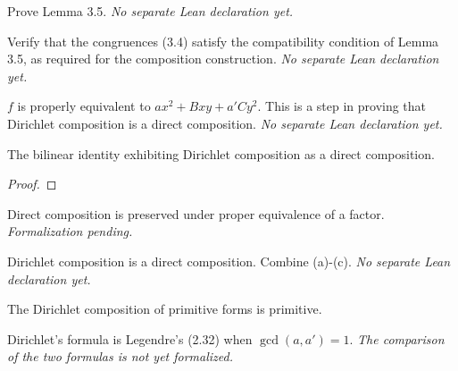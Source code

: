 \begin{theorem}[Exercise 3.3]
  \label{exr:s3_3}
  \notready
  Prove Lemma 3.5. \emph{No separate Lean declaration yet.}
\end{theorem}

\begin{theorem}[Exercise 3.4]
  \label{exr:s3_4}
  \notready
  Verify that the congruences (3.4) satisfy the compatibility condition of
  Lemma 3.5, as required for the composition construction.
  \emph{No separate Lean declaration yet.}
\end{theorem}

\begin{theorem}[Exercise 3.5(a)]
  \label{exr:s3_5_a}
  \notready
  $f$ is properly equivalent to $ax^2+Bxy+a'Cy^2$. This is a step in proving
  that Dirichlet composition is a direct composition.
  \emph{No separate Lean declaration yet.}
\end{theorem}

\begin{theorem}[Exercise 3.5(b)]
  \label{exr:s3_5_b}
  \leanok
  The bilinear identity exhibiting Dirichlet composition as a direct composition.
\end{theorem}
\begin{proof}\leanok\end{proof}

\begin{theorem}[Exercise 3.5(c)]
  \label{exr:s3_5_c}
  \notready
  Direct composition is preserved under proper equivalence of a factor.
  \emph{Formalization pending.}
\end{theorem}

\begin{theorem}[Exercise 3.5(d)]
  \label{exr:s3_5_d}
  \notready
  Dirichlet composition is a direct composition. Combine (a)-(c).
  \emph{No separate Lean declaration yet.}
\end{theorem}

\begin{theorem}[Exercise 3.5(e)]
  \label{exr:s3_5_e}
  \leanok
  The Dirichlet composition of primitive forms is primitive.
\end{theorem}

\begin{theorem}[Exercise 3.6(a)]
  \label{exr:s3_6_a}
  \notready
  Dirichlet's formula is Legendre's (2.32) when $\gcd(a,a')=1$.
  \emph{The comparison of the two formulas is not yet formalized.}
\end{theorem}

